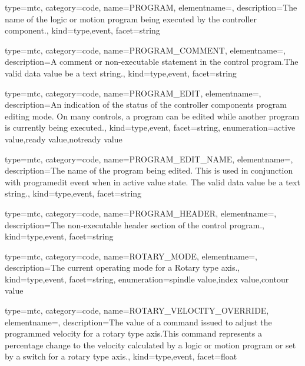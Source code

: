 {
  type=mtc,
  category=code,
  name={PROGRAM},
  elementname=,
  description={The name of the logic or motion program being executed by the \gls{controller} component.},
  kind={type,event},
  facet={\gls{string}}
}


{
  type=mtc,
  category=code,
  name={PROGRAM\_COMMENT},
  elementname=,
  description={A comment or non-executable statement in the control program.The \gls{valid data value} \must be a text string.},
  kind={type,event},
  facet={\gls{string}}
}


{
  type=mtc,
  category=code,
  name={PROGRAM\_EDIT},
  elementname=,
  description={An indication of the status of the \gls{controller} components program editing mode. \newline On many controls, a program can be edited while another program is currently being executed.},
  kind={type,event},
  facet={\gls{string}},
  enumeration={\gls{active value},\gls{ready value},\gls{notready value}}
}


{
  type=mtc,
  category=code,
  name={PROGRAM\_EDIT\_NAME},
  elementname=,
  description={The name of the program being edited. \newline This is used in conjunction with \gls{programedit event} when in \gls{active value} state. \newline The \gls{valid data value} \must be a text string.},
  kind={type,event},
  facet={\gls{string}}
}


{
  type=mtc,
  category=code,
  name={PROGRAM\_HEADER},
  elementname=,
  description={The non-executable header section of the control program.},
  kind={type,event},
  facet={\gls{string}}
}


{
  type=mtc,
  category=code,
  name={ROTARY\_MODE},
  elementname=,
  description={The current operating mode for a Rotary type axis.},
  kind={type,event},
  facet={\gls{string}},
  enumeration={\gls{spindle value},\gls{index value},\gls{contour value}}
}


{
  type=mtc,
  category=code,
  name={ROTARY\_VELOCITY\_OVERRIDE},
  elementname=,
  description={The value of a command issued to adjust the programmed velocity for a \gls{rotary} type axis.This command represents a percentage change to the velocity calculated by a logic or motion program or set by a switch for a \gls{rotary} type axis.},
  kind={type,event},
  facet={\gls{float}}
}


